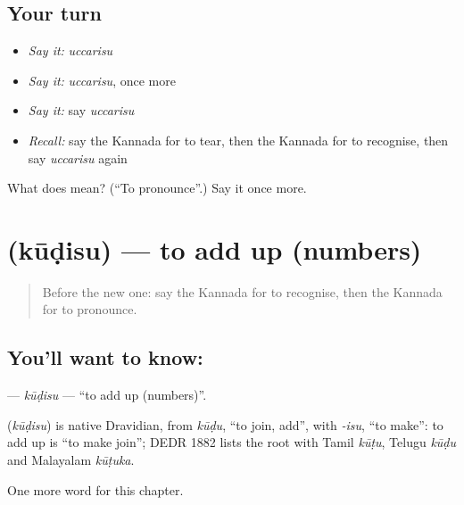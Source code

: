 \subsection*{Your turn}
\begin{itemize}
\raggedright
  \item \emph{Say it:} \emph{uccarisu}
  \item \emph{Say it:} \emph{uccarisu}, once more
  \item \emph{Say it:} say \emph{uccarisu}
  \item \emph{Recall:} say the Kannada for to tear, then the Kannada for to recognise, then say \emph{uccarisu} again
\end{itemize}

\begin{tcolorbox}[breakable,colback=teal!4,colframe=teal!35!black,title={Before you move on}]
What does  mean? (\textquotedblleft{}To pronounce\textquotedblright{}.) Say it once more.
\end{tcolorbox}
\section[\texorpdfstring{\kn{ಕೂಡಿಸು} (kūḍisu)}{ಕೂಡಿಸು (kūḍisu)}]{ (kūḍisu) — to add up (numbers)}

\label{lesson:KA-C243-kudisu}



\begin{quote}
Before the new one: say the Kannada for to recognise, then the Kannada for to pronounce.
\end{quote}

\subsection*{You'll want to know: }
\textbf{} — \emph{kūḍisu} — \textquotedblleft{}to add up (numbers)\textquotedblright{}.

\begin{cousinweb}
\textbf{} (\emph{kūḍisu}) is native Dravidian, from \emph{kūḍu}, \textquotedblleft{}to join, add\textquotedblright{}, with \emph{-isu}, \textquotedblleft{}to make\textquotedblright{}: to add up is \textquotedblleft{}to make join\textquotedblright{}; DEDR 1882 lists the root with Tamil \emph{kūṭu}, Telugu \emph{kūḍu} and Malayalam \emph{kūṭuka}.
\end{cousinweb}

\begin{grammarlens}[title={What you've built}]
One more word for this chapter.
\end{grammarlens}

